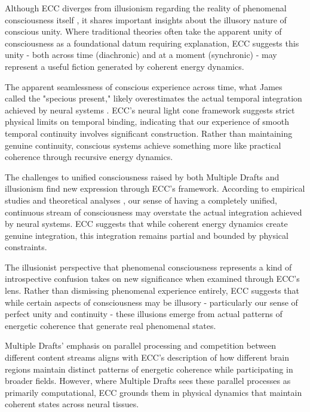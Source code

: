 \begin{refsection}
Although ECC diverges from illusionism regarding the reality of phenomenal consciousness itself \cite{Frankish2019}, it shares important insights about the illusory nature of conscious unity. Where traditional theories often take the apparent unity of consciousness as a foundational datum requiring explanation, ECC suggests this unity - both across time (diachronic) and at a moment (synchronic) - may represent a useful fiction generated by coherent energy dynamics.

The apparent seamlessness of conscious experience across time, what James called the "specious present," likely overestimates the actual temporal integration achieved by neural systems \cite{VanGulick2018}. ECC's neural light cone framework suggests strict physical limits on temporal binding, indicating that our experience of smooth temporal continuity involves significant construction. Rather than maintaining genuine continuity, conscious systems achieve something more like practical coherence through recursive energy dynamics.

The challenges to unified consciousness raised by both Multiple Drafts and illusionism find new expression through ECC's framework. According to empirical studies and theoretical analyses \cite{Schwitzgebel2011}, our sense of having a completely unified, continuous stream of consciousness may overstate the actual integration achieved by neural systems. ECC suggests that while coherent energy dynamics create genuine integration, this integration remains partial and bounded by physical constraints.

The illusionist perspective that phenomenal consciousness represents a kind of introspective confusion \cite{Frankish2016} takes on new significance when examined through ECC's lens. Rather than dismissing phenomenal experience entirely, ECC suggests that while certain aspects of consciousness may be illusory - particularly our sense of perfect unity and continuity - these illusions emerge from actual patterns of energetic coherence that generate real phenomenal states.

Multiple Drafts' emphasis on parallel processing and competition between different content streams \cite{Dennett1992} aligns with ECC's description of how different brain regions maintain distinct patterns of energetic coherence while participating in broader fields. However, where Multiple Drafts sees these parallel processes as primarily computational, ECC grounds them in physical dynamics that maintain coherent states across neural tissues.


\end{refsection}
